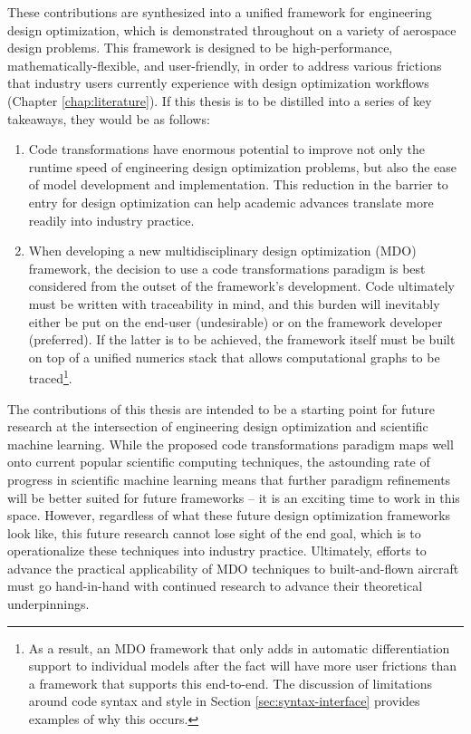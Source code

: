 These contributions are synthesized into a unified framework for engineering design optimization, which is demonstrated throughout on a variety of aerospace design problems. This framework is designed to be high-performance, mathematically-flexible, and user-friendly, in order to address various frictions that industry users currently experience with design optimization workflows (Chapter \ref{chap:literature}). If this thesis is to be distilled into a series of key takeaways, they would be as follows:
\begin{enumerate}
    \item Code transformations have enormous potential to improve not only the runtime speed of engineering design optimization problems, but also the ease of model development and implementation. This reduction in the barrier to entry for design optimization can help academic advances translate more readily into industry practice.
    \item When developing a new multidisciplinary design optimization (MDO) framework, the decision to use a code transformations paradigm is best considered from the outset of the framework's development. Code ultimately must be written with traceability in mind, and this burden will inevitably either be put on the end-user (undesirable) or on the framework developer (preferred). If the latter is to be achieved, the framework itself must be built on top of a unified numerics stack that allows computational graphs to be traced\footnote{As a result, an MDO framework that only adds in automatic differentiation support to individual models after the fact will have more user frictions than a framework that supports this end-to-end. The discussion of limitations around code syntax and style in Section \ref{sec:syntax-interface} provides examples of why this occurs.}.
\end{enumerate}

\noindent The contributions of this thesis are intended to be a starting point for future research at the intersection of engineering design optimization and scientific machine learning. While the proposed code transformations paradigm maps well onto current popular scientific computing techniques, the astounding rate of progress in scientific machine learning means that further paradigm refinements will be better suited for future frameworks -- it is an exciting time to work in this space. However, regardless of what these future design optimization frameworks look like, this future research cannot lose sight of the end goal, which is to operationalize these techniques into industry practice. Ultimately, efforts to advance the practical applicability of MDO techniques to built-and-flown aircraft must go hand-in-hand with continued research to advance their theoretical underpinnings.